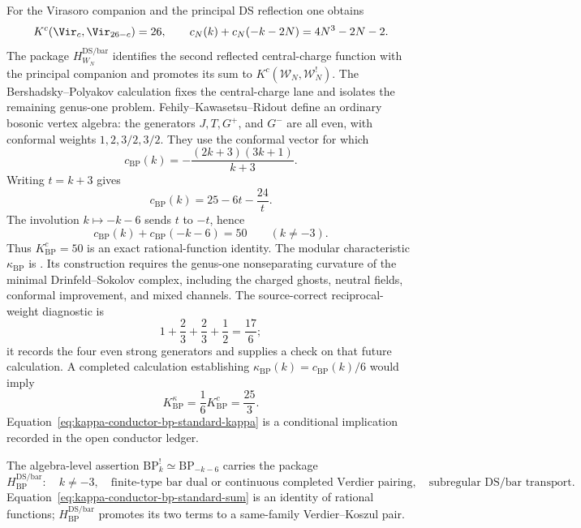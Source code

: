 For the Virasoro companion and the principal DS reflection one obtains
\[
K^c(\Vir_c,\Vir_{26-c})=26,
\qquad
c_N(k)+c_N(-k-2N)=4N^3-2N-2.
\]
The package $H_{W_N}^{\mathrm{DS/bar}}$ identifies the second reflected
central-charge function with the principal companion and promotes its
sum to $K^c(\mathcal W_N,\mathcal W_N^!)$.
The Bershadsky--Polyakov calculation fixes the central-charge lane and
isolates the remaining genus-one problem.  Fehily--Kawasetsu--Ridout
define an ordinary bosonic vertex algebra: the generators $J,T,G^+$,
and $G^-$ are all even, with conformal weights $1,2,3/2,3/2$.
They use the conformal vector
\cite[Eq.~\textup{(}2.2\textup{)}]{FKR20} for which
\begin{equation}
 \label{eq:kappa-conductor-bp-standard-c}
 c_{\mathrm{BP}}(k)
 =-\frac{(2k+3)(3k+1)}{k+3}.
\end{equation}
Writing $t=k+3$ gives
\[
 c_{\mathrm{BP}}(k)=25-6t-\frac{24}{t}.
\]
The involution $k\mapsto-k-6$ sends $t$ to $-t$, hence
\begin{equation}
 \label{eq:kappa-conductor-bp-standard-sum}
 c_{\mathrm{BP}}(k)+c_{\mathrm{BP}}(-k-6)=50
 \qquad (k\ne-3).
\end{equation}
Thus $K^c_{\mathrm{BP}}=50$ is an exact rational-function identity.
The modular characteristic $\kappa_{\mathrm{BP}}$ is
\ClaimStatusOpen.  Its construction requires the genus-one
nonseparating curvature of the minimal Drinfeld--Sokolov complex,
including the charged ghosts, neutral fields, conformal improvement,
and mixed channels.  The source-correct reciprocal-weight diagnostic is
\[
 1+\frac23+\frac23+\frac12=\frac{17}{6};
\]
it records the four even strong generators and supplies a check on that
future calculation.  A completed calculation establishing
$\kappa_{\mathrm{BP}}(k)=c_{\mathrm{BP}}(k)/6$ would imply
\begin{equation}
 \label{eq:kappa-conductor-bp-standard-kappa}
 K^\kappa_{\mathrm{BP}}=\frac16K^c_{\mathrm{BP}}=\frac{25}{3}.
\end{equation}
Equation~\eqref{eq:kappa-conductor-bp-standard-kappa} is a conditional
implication recorded in the open conductor ledger.

The algebra-level assertion
$\mathrm{BP}_k^!\simeq\mathrm{BP}_{-k-6}$ carries the package
\[
 H_{\mathrm{BP}}^{\mathrm{DS/bar}}:
 \quad k\ne-3,\quad
 \text{finite-type bar dual or continuous completed Verdier pairing},
 \quad\text{subregular DS/bar transport}.
\]
Equation~\eqref{eq:kappa-conductor-bp-standard-sum} is an identity of
rational functions; $H_{\mathrm{BP}}^{\mathrm{DS/bar}}$ promotes its
two terms to a same-family Verdier--Koszul pair.

